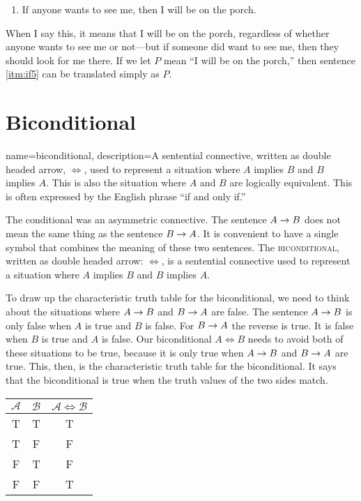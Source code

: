 \begin{enumerate}
\item If anyone wants to see me, then I will be on the porch. \label{itm:if5}
\end{enumerate}

When I say this, it means that I will be on the porch, regardless of whether anyone wants to see me or not---but if someone did want to see me, then they should look for me there. If we let $P$ mean ``I will be on the porch,'' then sentence \ref{itm:if5} can be translated simply as $P$.


\section{Biconditional}

{
name=biconditional,
description={A sentential connective, written as double headed arrow, $\iff$, used to represent a situation where $A$ implies  $B$ and $B$ implies $A$. This is also the situation where $A$ and $B$ are logically equivalent. This is often expressed by the English phrase ``if and only if.''}
}

The conditional was an asymmetric connective. The sentence $A \mathrel{\rightarrow} B$ does not mean the same thing as the sentence $B \mathrel{\rightarrow} A$. It is convenient to have a single symbol that combines the meaning of these two sentences. The \textsc{\gls{biconditional}}\label{def:bicondional}, written as double headed arrow: $\iff$, is a sentential connective used to represent a situation where $A$ implies $B$ and $B$ implies $A$.

To draw up the characteristic truth table for the biconditional, we need to think about the situations where $A \mathrel{\rightarrow} B$ and $B \mathrel{\rightarrow} A$ are false. The sentence $A \mathrel{\rightarrow} B$ is only false when $A$ is true and $B$ is false. For $B \mathrel{\rightarrow} A$ the reverse is true. It is false when $B$ is true and $A$ is false. Our biconditional $A \iff B$ needs to avoid both of these situations to be true, because it is only true when $A \mathrel{\rightarrow} B$ and $B \mathrel{\rightarrow} A$ are true. This, then, is the characteristic truth table for the biconditional. It says that the biconditional is true when the truth values of the two sides match.

\begin{center}
\begin{tabular}{c|c|c}
$\mathcal{A}$ & $\mathcal{B}$ & $\mathcal{A} \iff \mathcal{B}$\\
\hline
T & T & T\\
T & F & F\\
F & T & F\\
F & F & T
\end{tabular}
\end{center}

